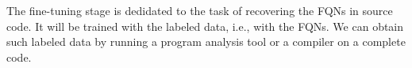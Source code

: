 The fine-tuning stage is dedidated to the task of recovering the FQNs
in source code. It will be trained with the labeled data, i.e., with
the FQNs. We can obtain such labeled data by running a program
analysis tool or a compiler on a complete code.

